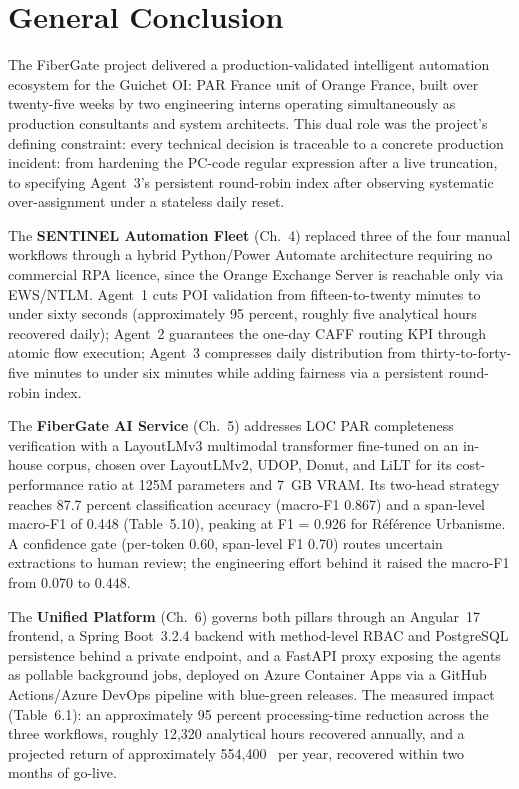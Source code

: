 \chapter*{General Conclusion}
\thispagestyle{MyStyle}

The FiberGate project delivered a production-validated intelligent automation ecosystem for the Guichet OI: PAR France unit of Orange France, built over twenty-five weeks by two engineering interns operating simultaneously as production consultants and system architects. This dual role was the project's defining constraint: every technical decision is traceable to a concrete production incident: from hardening the PC-code regular expression after a live truncation, to specifying Agent~3's persistent round-robin index after observing systematic over-assignment under a stateless daily reset.

The \textbf{SENTINEL Automation Fleet} (Ch.~4) replaced three of the four manual workflows through a hybrid Python/Power Automate architecture requiring no commercial RPA licence, since the Orange Exchange Server is reachable only via EWS/NTLM. Agent~1 cuts POI validation from fifteen-to-twenty minutes to under sixty seconds (approximately 95 percent, roughly five analytical hours recovered daily); Agent~2 guarantees the one-day CAFF routing KPI through atomic flow execution; Agent~3 compresses daily distribution from thirty-to-forty-five minutes to under six minutes while adding fairness via a persistent round-robin index.

The \textbf{FiberGate AI Service} (Ch.~5) addresses LOC PAR completeness verification with a LayoutLMv3 multimodal transformer fine-tuned on an in-house corpus, chosen over LayoutLMv2, UDOP, Donut, and LiLT for its cost-performance ratio at 125M parameters and 7~GB VRAM. Its two-head strategy reaches 87.7 percent classification accuracy (macro-F1 0.867) and a span-level macro-F1 of 0.448 (Table~5.10), peaking at F1 = 0.926 for R\'ef\'erence Urbanisme. A confidence gate (per-token 0.60, span-level F1 0.70) routes uncertain extractions to human review; the engineering effort behind it raised the macro-F1 from 0.070 to 0.448.

The \textbf{Unified Platform} (Ch.~6) governs both pillars through an Angular~17 frontend, a Spring Boot~3.2.4 backend with method-level RBAC and PostgreSQL persistence behind a private endpoint, and a FastAPI proxy exposing the agents as pollable background jobs, deployed on Azure Container Apps via a GitHub Actions/Azure DevOps pipeline with blue-green releases. The measured impact (Table~6.1): an approximately 95 percent processing-time reduction across the three workflows, roughly 12,320 analytical hours recovered annually, and a projected return of approximately 554,400~\texteuro{} per year, recovered within two months of go-live.

